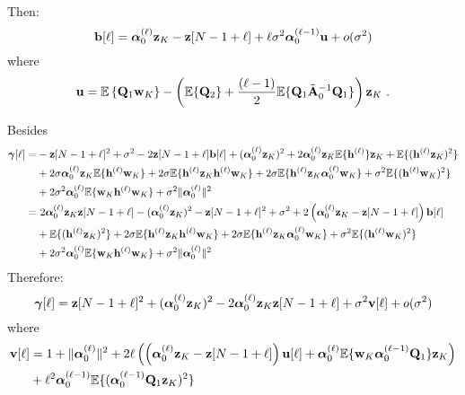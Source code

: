 Then:
\begin{equation}
\bb[\ell] =  \balpha_0^{(\ell)}\bz_{K} - \bz[N-1+\ell] + \ell\sigma^2\balpha_0^{(\ell-1)}\bu + o(\sigma^2)
\label{eq:bias.2}
\end{equation}
where
\begin{equation}
\bu = \EE\left\{\bQ_1\bw_K\right\}-\left(\EE\{\bQ_2\} + \dfrac{(\ell-1)}{2}\EE\{\bQ_1\tilde\bA_0^{-1}\bQ_1\}\right)\bz_K \ .
\label{eq:bias.err}
\end{equation}

Besides
\begin{align*}
\boldsymbol{\gamma}[\ell] =& -{\mathbf z}[N-1+\ell]^2 +\sigma^2 -2{\mathbf z}[N-1+\ell]{\mathbf b}[\ell] +(\boldsymbol{\alpha}_0^{(\ell)}{\mathbf z}_K)^2 +2\boldsymbol{\alpha}_0^{(\ell)}{\mathbf z}_K{\mathbb E}\{{\mathbf h}^{(\ell)}\}{\mathbf z}_K+ {\mathbb E}\{({\mathbf h}^{(\ell)}{\mathbf z}_K)^2\}  \\
&+ 2\sigma\boldsymbol{\alpha}_0^{(\ell)}{\mathbf z}_K{\mathbb E}\{{\mathbf h}^{(\ell)}{\mathbf w}_K\} + 2\sigma{\mathbb E}\{{\mathbf h}^{(\ell)}{\mathbf z}_K{\mathbf h}^{(\ell)}{\mathbf w}_K\} + 2\sigma{\mathbb E}\{{\mathbf h}^{(\ell)}{\mathbf z}_K\boldsymbol{\alpha}_0^{(\ell)}{\mathbf w}_K\} + \sigma^2{\mathbb E}\{({\mathbf h}^{(\ell)}{\mathbf w}_K)^2\} \\
&+ 2\sigma^2\boldsymbol{\alpha}_0^{(\ell)}{\mathbb E}\{{\mathbf w}_K{\mathbf h}^{(\ell)}{\mathbf w}_K\} + \sigma^2\|\boldsymbol{\alpha}_0^{(\ell)}\|^2 \\
=&\ 2\boldsymbol{\alpha}_0^{(\ell)}{\mathbf z}_K{\mathbf z}[N-1+\ell] -(\boldsymbol{\alpha}_0^{(\ell)}{\mathbf z}_K)^2-{\mathbf z}[N-1+\ell]^2 +\sigma^2 +2\left(\boldsymbol{\alpha}_0^{(\ell)}{\mathbf z}_K-{\mathbf z}[N-1+\ell]\right){\mathbf b}[\ell] \\
& +{\mathbb E}\{({\mathbf h}^{(\ell)}{\mathbf z}_K)^2\} + 2\sigma{\mathbb E}\{{\mathbf h}^{(\ell)}{\mathbf z}_K{\mathbf h}^{(\ell)}{\mathbf w}_K\} + 2\sigma{\mathbb E}\{{\mathbf h}^{(\ell)}{\mathbf z}_K\boldsymbol{\alpha}_0^{(\ell)}{\mathbf w}_K\} + \sigma^2{\mathbb E}\{({\mathbf h}^{(\ell)}{\mathbf w}_K)^2\} \\
&+ 2\sigma^2\boldsymbol{\alpha}_0^{(\ell)}{\mathbb E}\{{\mathbf w}_K{\mathbf h}^{(\ell)}{\mathbf w}_K\} + \sigma^2\|\boldsymbol{\alpha}_0^{(\ell)}\|^2
\end{align*}
Therefore:
\begin{equation}
\bgamma[\ell] = \bz[N-1+\ell]^2 +(\balpha_0^{(\ell)}\bz_K)^2 -2\balpha_0^{(\ell)}\bz_K\bz[N-1+\ell]  +\sigma^2\bv[\ell] + o(\sigma^2)
\label{eq:mse}
\end{equation}
where
\begin{align}
\nonumber
\bv[\ell] &= 1+\|\balpha_0^{(\ell)}\|^2 +2\ell\left( \left(\balpha_0^{(\ell)}\bz_K-\bz[N-1+\ell]\right)\bu[\ell] +\balpha_0^{(\ell)}\EE\{\bw_K \balpha_0^{(\ell-1)}\bQ_1\}\bz_K \right)  \\
&  +\ell^2\balpha_0^{(\ell-1)}\EE\{(\balpha_0^{(\ell-1)}\bQ_1\bz_K)^2\}
\label{eq:mse.err}
\end{align}

